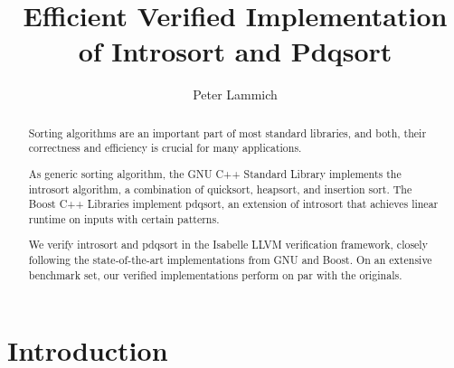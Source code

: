 \documentclass[runningheads]{llncs}
\begin{document}
\title{Efficient Verified Implementation of Introsort and Pdqsort}


\author{Peter Lammich}
%

\maketitle



\begin{abstract}
  Sorting algorithms are an important part of most standard libraries, and
  both, their correctness and efficiency is crucial for many applications.

  As generic sorting algorithm, the GNU C++ Standard Library implements the introsort algorithm,
  a combination of quicksort, heapsort, and insertion sort. The Boost C++ Libraries implement pdqsort,
  an extension of introsort that achieves linear runtime on inputs with certain patterns.

  We verify introsort and pdqsort in the Isabelle LLVM verification framework,
  closely following the state-of-the-art implementations from GNU and Boost.
  On an extensive benchmark set, our verified implementations perform on par with the originals.
\end{abstract}






\section{Introduction}
\end{document}
